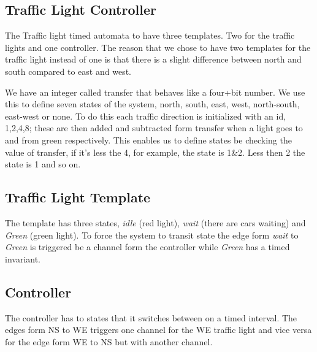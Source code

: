 \subsection{Traffic Light Controller}
\label{sec:org7954bf6}
The Traffic light timed automata to have three templates. Two for the traffic lights and one controller. The reason that we chose to have two templates for the traffic light instead of one is that there is a slight difference between north and south compared to east and west. 

We have an integer called transfer that behaves like a four+bit number. We use this to define seven states of the system, north, south, east, west, north-south, east-west or none. To do this each traffic direction is initialized with an id, 1,2,4,8; these are then added and subtracted form transfer when a light goes to and from green respectively. This enables us to define states be checking the value of transfer, if it's less the 4, for example, the state is 1\&2. Less then 2 the state is 1 and so on.

\subsection{Traffic Light Template}
\label{sec:orgc8497f6}
The template has three states, \emph{idle} (red light), \emph{wait} (there are cars waiting) and \emph{Green} (green light). To force the system to transit state the edge form \emph{wait} to \emph{Green} is triggered be a channel form the controller while \emph{Green} has a timed invariant. 

\subsection{Controller}
\label{sec:org0c24095}
The controller has to states that it switches between on a timed interval. The edges form NS to WE triggers one channel for the WE traffic light and vice versa for the edge form WE to NS but with another channel.

